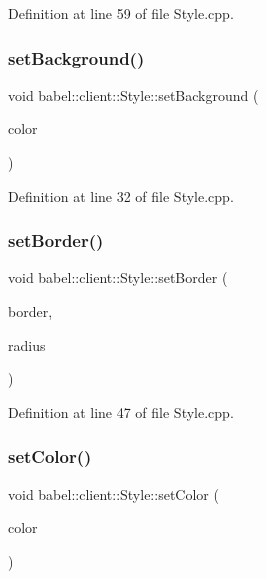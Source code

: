 Definition at line 59 of file Style.\+cpp.

\mbox{\label{classbabel_1_1client_1_1_style_a0e71aba88bb3e5b189c65f4c64d12b11}} 
\subsubsection{\texorpdfstring{set\+Background()}{setBackground()}}
{\footnotesize\ttfamily void babel\+::client\+::\+Style\+::set\+Background (\begin{DoxyParamCaption}\item[{Q\+String}]{color }\end{DoxyParamCaption})}



Definition at line 32 of file Style.\+cpp.

\mbox{\label{classbabel_1_1client_1_1_style_ad7735aeb6a13a053a98c9a1bc0dad046}} 
\subsubsection{\texorpdfstring{set\+Border()}{setBorder()}}
{\footnotesize\ttfamily void babel\+::client\+::\+Style\+::set\+Border (\begin{DoxyParamCaption}\item[{Q\+String}]{border,  }\item[{int}]{radius }\end{DoxyParamCaption})}



Definition at line 47 of file Style.\+cpp.

\mbox{\label{classbabel_1_1client_1_1_style_a773b09c82a2f634d48aa3050d23bdcc9}} 
\subsubsection{\texorpdfstring{set\+Color()}{setColor()}}
{\footnotesize\ttfamily void babel\+::client\+::\+Style\+::set\+Color (\begin{DoxyParamCaption}\item[{Q\+String}]{color }\end{DoxyParamCaption})}



